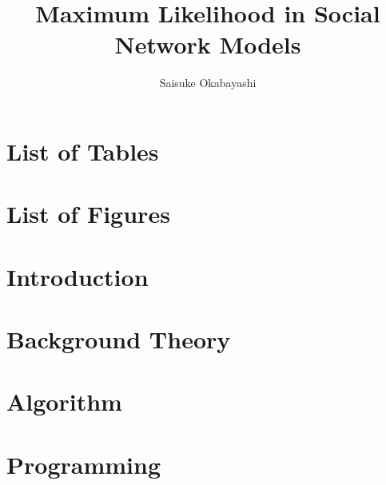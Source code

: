 \documentclass[oneside]{myumnStatThesis}
\author{Saisuke Okabayashi}
\title{Maximum Likelihood in 
 Social Network Models}
\begin{document}
\maketitlepage %

\begin{abstract}

\end{abstract}

\tableofcontents %

\newpage
\chapter*{List of Tables}
{\def\chapter*#1{}
\listoftables}

\newpage
\chapter*{List of Figures}
{\def\chapter*#1{}
\listoffigures}


\mainmatter
\onehalfspacing %
\small  %

\chapter{Introduction}


\chapter{Background Theory}\label{Section:Background}


\chapter{Algorithm}
 

\chapter{Programming}
 
\end{document}
